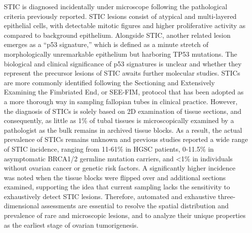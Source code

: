 \begin{refsection}
    STIC is diagnosed incidentally under microscope following the pathological criteria previously reported\cite{Vang2012Validation,Negri2024Diagnosis}. STIC lesions consist of atypical and multi-layered epithelial cells, with detectable mitotic figures and higher proliferative activity as compared to background epithelium. Alongside STIC, another related lesion emerges as a “p53 signature,” which is defined as a minute stretch of morphologically unremarkable epithelium but harboring TP53 mutations. The biological and clinical significance of p53 signatures is unclear and whether they represent the precursor lesions of STIC awaits further molecular studies. STICs are more commonly identified following the Sectioning and Extensively Examining the Fimbriated End, or SEE-FIM, protocol that has been adopted as a more thorough way in sampling fallopian tubes in clinical practice\cite{Medeiros2006tubal,Lamb2006Predictors,Mahe2013Do}. However, the diagnosis of STICs is solely based on 2D examination of tissue sections, and consequently, as little as 1\% of tubal tissues is microscopically examined by a pathologist as the bulk remains in archived tissue blocks\cite{Bogaerts2022Recommendations,Vang2013Fallopian,Akahane2022TP53,KiemenPanIN}. As a result, the actual prevalence of STICs remains unknown and previous studies reported a wide range of STIC incidence, ranging from 11-61\% in HGSC patients\cite{Chen2017Serous}, 0-11.5\% in asymptomatic BRCA1/2 germline mutation carriers\cite{Kim2018Cell,Bogaerts2022Recommendations,Wethington2013Clinical,Visvanathan2018Fallopian}, and <1\% in individuals without ovarian cancer or genetic risk factors\cite{Meserve2017Frequency,Samimi2018Population,Morrison2015Incidental}.  A significantly higher incidence was noted when the tissue blocks were flipped over and additional sections examined\cite{Visvanathan2018Fallopian}, supporting the idea that current sampling lacks the sensitivity to exhaustively detect STIC lesions. Therefore, automated and exhaustive three-dimensional assessments are essential to resolve the spatial distribution and prevalence of rare and microscopic lesions, and to analyze their unique properties as the earliest stage of ovarian tumorigenesis\cite{Forjaz2025Three,Liu2023Engineering,Song2024Analysis,Lin2023Multiplexed,Serafin2023Nondestructive,Crawford2024Combined,Vaughan2011Rethinking,Kiemen2022CODA,Kiemen20243D}.

\end{refsection}
